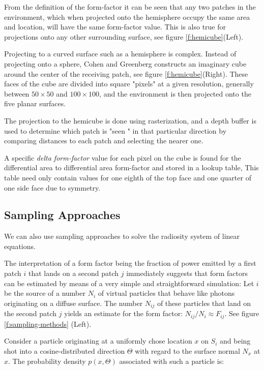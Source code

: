 From the definition of the form-factor it can be seen that any two patches in the environment, which when projected onto the hemisphere occupy the same area and location, will have the same form-factor value. This is also true for projections onto any other surrounding surface, see figure \ref{f:hemicube}(Left).

Projecting to a curved surface such as a hemisphere is complex. Instead of projecting onto a sphere, Cohen and Greenberg \cite{a:Thehemi-cube:aradiositysolutionforcomplexenvironments} constructs an imaginary cube around the center of the receiving patch, see figure \ref{f:hemicube}(Right). These faces of the cube are divided into square "pixels" at a given resolution, generally between $50\times 50$ and $100\times 100$, and the environment is then projected onto the five planar surfaces.

The projection to the hemicube is done using rasterization, and a depth buffer is used to determine which patch is "seen " in that particular direction by comparing distances to each patch and selecting the nearer one. 

A specific \textit{delta form-factor} value for each pixel on the cube is found for the differential area to differential area form-factor and stored in a lookup table, This table need only contain values for one eighth of the top face and one quarter of one side face due to symmetry.



\subsection{Sampling Approaches}
We can also use sampling approaches to solve the radiosity system of linear equations.

The interpretation of a form factor being the fraction of power emitted by a first patch $i$ that lands on a second patch $j$ immediately suggests that form factors can be estimated by means of a very simple and straightforward simulation: Let $i$ be the source of a number $N_i$ of virtual particles that behave like photons originating on a diffuse surface. The number $N_{ij}$ of these particles that land on the second patch $j$ yields an estimate for the form factor: $N_{ij}/N_i\approx F_{ij}$. See figure \ref{f:sampling-methods} (Left).

Consider a particle originating at a uniformly chose location $x$ on $S_i$ and being shot into a cosine-distributed direction $\Theta$ with regard to the surface normal $N_x$ at $x$. The probability density $p(x,\Theta)$ associated with such a particle is:

